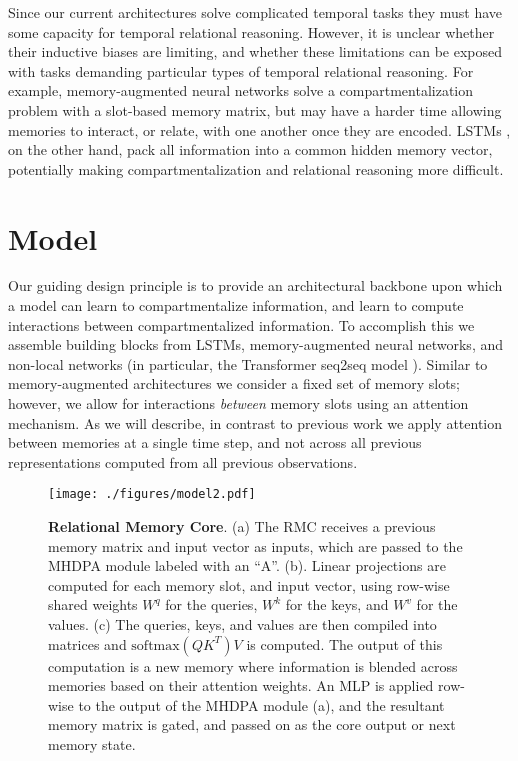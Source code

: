\documentclass{article}
\begin{document}
Since our current architectures solve complicated temporal tasks they must have some capacity for temporal relational reasoning. However, it is unclear whether their inductive biases are limiting, and whether these limitations can be exposed with tasks demanding particular types of temporal relational reasoning. For example, memory-augmented neural networks \citep{graves2014neural,graves2016hybrid,santoro2016meta,sukhbaatar2015end} solve a compartmentalization problem with a slot-based memory matrix, but may have a harder time allowing memories to interact, or relate, with one another once they are encoded. LSTMs \citep{hochreiter1998lstm, Graves13}, on the other hand, pack all information into a common hidden memory vector, potentially making compartmentalization and relational reasoning more difficult.  \section{Model}
Our guiding design principle is to provide an architectural backbone upon which a model can learn to compartmentalize information, and learn to compute interactions between compartmentalized information. To accomplish this we assemble building blocks from LSTMs, memory-augmented neural networks, and non-local networks (in particular, the Transformer seq2seq model \cite{vaswani2017attention}). Similar to memory-augmented architectures we consider a fixed set of memory slots; however, we allow for interactions \textit{between} memory slots using an attention mechanism. As we will describe, in contrast to previous work we apply attention between memories at a single time step, and not across all previous representations computed from all previous observations.

\begin{figure}
    \centering
    \texttt{[image: ./figures/model2.pdf]}
    \caption{\textbf{Relational Memory Core}. (a) The RMC receives a previous memory matrix and input vector as inputs, which are passed to the MHDPA module labeled with an ``A''. (b). Linear projections are computed for each memory slot, and input vector, using row-wise shared weights $W^q$ for the queries, $W^k$ for the keys, and $W^v$ for the values. (c) The queries, keys, and values are then compiled into matrices and $\text{softmax}(QK^T)V$ is computed. The output of this computation is a new memory where information is blended across memories based on their attention weights. An MLP is applied row-wise to the output of the MHDPA module (a), and the resultant memory matrix is gated, and passed on as the core output or next memory state.}
    \label{fig:model}
\end{figure}
\end{document}
